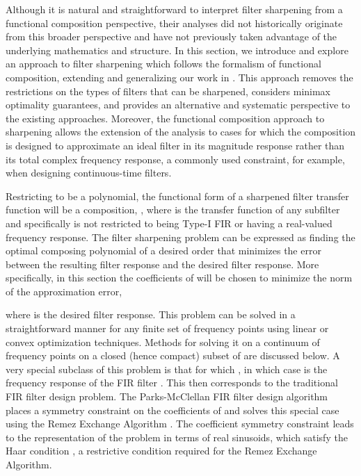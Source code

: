 \documentclass[journal] {IEEEtran}
\begin{document}
Although it is natural and straightforward to interpret filter sharpening from a functional composition perspective, their analyses did not historically originate from this broader perspective and have not previously taken advantage of the underlying mathematics and structure. In this section, we introduce and explore an approach to filter sharpening which follows the formalism of functional composition, extending and generalizing our work in \cite{DemirtasAllerton2013}. This approach removes the restrictions on the types of filters that can be sharpened, considers minimax optimality guarantees, and provides an alternative and systematic perspective to the existing approaches. Moreover, the functional composition approach to sharpening allows the extension of the analysis to cases for which the composition is designed to approximate an ideal filter in its magnitude response rather than its total complex frequency response, a commonly used constraint, for example, when designing continuous-time filters.

Restricting  to be a polynomial, the functional form of a sharpened filter transfer function will be a composition, , where  is the transfer function of any subfilter and specifically is not restricted to being Type-I FIR or having a real-valued frequency response. The filter sharpening problem can be expressed as finding the optimal composing polynomial  of a desired order  that minimizes the error between the resulting filter response and the desired filter response. More specifically, in this section the coefficients  of  will be chosen to minimize the  norm of the approximation error,

where  is the desired filter response. This problem can be solved in a straightforward manner for any finite set of frequency points using linear or convex optimization techniques. Methods for solving it on a continuum of frequency points on a closed (hence compact) subset of  are discussed below. A very special subclass of this problem is that for which , in which case  is the frequency response of the FIR filter . This then corresponds to the traditional FIR filter design problem. The Parks-McClellan FIR filter design algorithm \cite{Parks1972} places a symmetry constraint on the coefficients of  and solves this special case using the Remez Exchange Algorithm \cite{Cheney1966}. The coefficient symmetry constraint leads to the representation of the problem in terms of real sinusoids, which satisfy the Haar condition \cite{Cheney1966, Meinardus1967}, a restrictive condition required for the Remez Exchange Algorithm.
\end{document}
